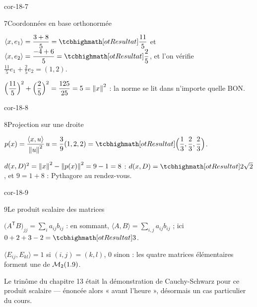 \begin{blocLivre}{cor-18-7}
\begin{corrige}{7}{Coordonnées en base orthonormée}
\begin{questions}
  \item $\langle x,e_1\rangle=\dfrac{3+8}{5}=\res{\dfrac{11}{5}}$ et
    $\langle x,e_2\rangle=\dfrac{-4+6}{5}=\res{\dfrac25}$, et l'on
    vérifie $\frac{11}{5}e_1+\frac25e_2=(1,2)$.
  \item $\Bigl(\dfrac{11}{5}\Bigr)^{2}+\Bigl(\dfrac25\Bigr)^{2}
    =\dfrac{125}{25}=5=\left\lVert x\right\rVert^{2}$ : la norme se lit dans n'importe
    quelle BON.
\end{questions}
\end{corrige}
\end{blocLivre}

\begin{blocLivre}{cor-18-8}
\begin{corrige}{8}{Projection sur une droite}
\begin{questions}
  \item $p(x)=\dfrac{\langle x,u\rangle}{\norme{u}^{2}}\,u
    =\dfrac39(1,2,2)=\res{\Bigl(\dfrac13,\dfrac23,\dfrac23\Bigr)}$.
  \item $d(x,D)^{2}=\left\lVert x\right\rVert^{2}-\left\lVert p(x)\right\rVert^{2}=9-1=8$ :
    $d(x,D)=\res{2\sqrt2}$, et $9=1+8$ : Pythagore au rendez-vous.
\end{questions}
\end{corrige}
\end{blocLivre}

\begin{blocLivre}{cor-18-9}
\begin{corrige}{9}{Le produit scalaire des matrices}
\begin{questions}
  \item $\bigl(A^{\mathsf T}B\bigr)_{jj}=\sum_ia_{ij}b_{ij}$ : en
    sommant, $\langle A,B\rangle=\sum_{i,j}a_{ij}b_{ij}$ ; ici
    $0+2+3-2=\res{3}$.
  \item $\langle E_{ij},E_{kl}\rangle=1$ si $(i,j)=(k,l)$, $0$ sinon :
    les quatre matrices élémentaires forment une  de
    $\mathcal{M}_2(1.9)$.
  \item Le trinôme du chapitre 13 était la démonstration de
    Cauchy-Schwarz pour ce produit scalaire — énoncée alors « avant
    l'heure », désormais un cas particulier du cours.
\end{questions}
\end{corrige}
\end{blocLivre}

